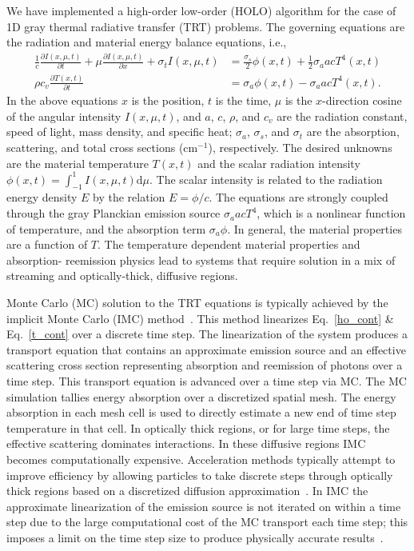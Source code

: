 \documentclass[12pt]{article}
\newcommand{\pderiv}[2]{\frac{\partial #1}{\partial #2}}
\renewcommand{\d}{\mathrm{d}}
\begin{document}
\begin{center}
We have implemented a high-order low-order (HOLO) algorithm for the case of 1D gray thermal radiative transfer (TRT) problems. The governing equations are the radiation and
material energy balance equations, i.e.,\vspace{-0.05in}
\begin{align}\label{ho_cont}
    \frac{1}{c}\pderiv{I(x,\mu,t)}{t} + \mu \pderiv{I(x,\mu,t)}{x} + \sigma_t
    I(x,\mu,t)
&= \frac{\sigma_s}{2} \phi(x,t) +\frac{1}{2} \sigma_a a c T^4(x,t)
    \\ \label{t_cont}
  \rho c_v \pderiv{T(x,t)}{t} &=  \sigma_a \phi(x,t) - \sigma_a a c T^4(x,t).
\end{align}
In the above equations $x$ is the position, $t$ is the time, $\mu$ is
the $x$-direction cosine of the angular intensity $I(x,\mu,t)$, and $a$, $c$, $\rho$,
and
$c_v$ are the radiation constant, speed of light, mass density, and specific heat; $\sigma_a$, $\sigma_s$, and
$\sigma_t$ are the absorption, scattering, and total
cross sections (cm$^{-1}$), respectively. The desired unknowns are the material
temperature $T(x,t)$ and the scalar radiation intensity $\phi(x,t)=\int_{-1}^1
I(x,\mu,t) \d \mu$.  The scalar intensity is related to the radiation energy density
$E$ by the relation $E = \phi/c$.  The equations are
strongly coupled through the gray Planckian emission source $\sigma_a a c T^4$, which
is a nonlinear function of temperature, and the absorption
term $\sigma_a \phi$.   In general, the material properties are a function of $T$.  The temperature dependent material properties and
absorption- reemission physics lead to systems that require solution in a mix of
streaming and optically-thick, diffusive regions. 

Monte Carlo (MC) solution to the TRT equations is typically achieved by the 
implicit Monte Carlo (IMC) method~\cite{fnc}. This
method linearizes Eq.~\eqref{ho_cont} \& Eq.~\eqref{t_cont} over a discrete time
step.  The linearization of the system produces a transport equation that contains an approximate emission source and an effective scattering cross section representing
absorption and reemission of photons over a time step. This transport equation is
advanced over a time step via MC. The MC simulation tallies energy absorption
over a discretized spatial mesh.  The energy absorption in each mesh cell is used to directly estimate
a new end of time step temperature in that cell.  In optically thick regions, or for
large time steps, the
effective scattering dominates interactions.  In these diffusive regions IMC
becomes computationally expensive. Acceleration methods typically attempt to improve
efficiency by allowing particles to take discrete steps through optically thick
regions based on a discretized diffusion approximation~\cite{imd,ddmc}. 
In IMC the
approximate linearization of the emission source is not iterated on within a time
step due to the large computational cost of the MC transport each time step; this
imposes a limit on the time step size to produce physically accurate
results~\cite{wollaber2013discrete}. 


\end{center}
\end{document}

